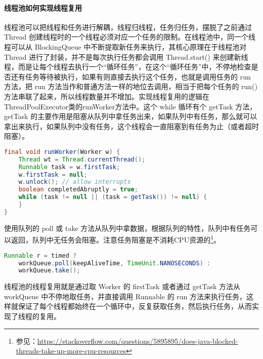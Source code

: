 \documentclass[../../../interview-questions.tex]{subfiles}
\begin{document}
\paragraph{线程池如何实现线程复用}

线程池可以把线程和任务进行解耦，线程归线程，任务归任务，摆脱了之前通过 Thread 创建线程时的一个线程必须对应一个任务的限制。在线程池中，同一个线程可以从 BlockingQueue 中不断提取新任务来执行，其核心原理在于线程池对 Thread 进行了封装，并不是每次执行任务都会调用 Thread.start() 来创建新线程，而是让每个线程去执行一个“循环任务”，在这个“循环任务”中，不停地检查是否还有任务等待被执行，如果有则直接去执行这个任务，也就是调用任务的 run 方法，把 run 方法当作和普通方法一样的地位去调用，相当于把每个任务的 run() 方法串联了起来，所以线程数量并不增加。实现线程复用的逻辑在ThreadPoolExecutor类的runWorker方法中。这个 while 循环有个 getTask 方法，getTask 的主要作用是阻塞从队列中拿任务出来，如果队列中有任务，那么就可以拿出来执行，如果队列中没有任务，这个线程会一直阻塞到有任务为止（或者超时阻塞）。

\begin{lstlisting}[language=Java]
final void runWorker(Worker w) {
    Thread wt = Thread.currentThread();
    Runnable task = w.firstTask;
    w.firstTask = null;
    w.unlock(); // allow interrupts
    boolean completedAbruptly = true;
    while (task != null || (task = getTask()) != null) {
    }
}
\end{lstlisting}

使用队列的 poll 或 take 方法从队列中拿数据，根据队列的特性，队列中有任务可以返回，队列中无任务会阻塞。注意任务阻塞是不消耗CPU资源的\footnote{参见：\url{https://stackoverflow.com/questions/5895895/does-java-blocked-threads-take-up-more-cpu-resources}}。

\begin{lstlisting}[language=Java]
Runnable r = timed ?
    workQueue.poll(keepAliveTime, TimeUnit.NANOSECONDS) :
    workQueue.take();
\end{lstlisting}
    

线程池的线程复用就是通过取 Worker 的 firstTask 或者通过 getTask 方法从 workQueue 中不停地取任务，并直接调用 Runnable 的 run 方法来执行任务，这样就保证了每个线程都始终在一个循环中，反复获取任务，然后执行任务，从而实现了线程的复用。
\end{document}
